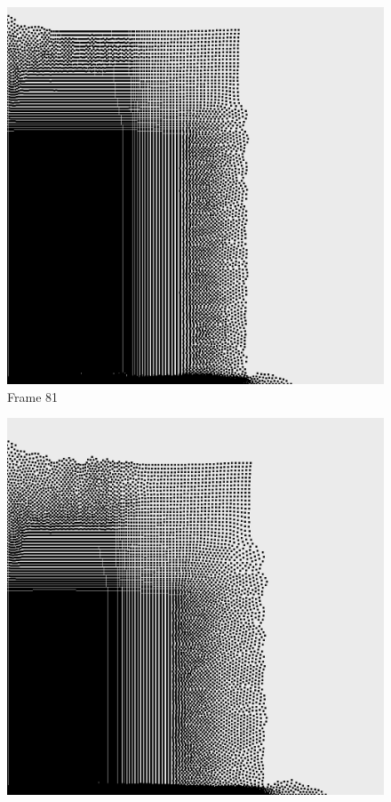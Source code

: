 \documentclass[a4paper, 12pt, oneside]{book}
\begin{document}
\begin{figure}[!ht]
    \addvspace{0.5ex}
        \begin{center}
            \includegraphics[width=\linewidth]{images/test_case_2/81.png}
            Frame 81
        \end{center}
    \endminipage
    \hfill
        \begin{center}
            \includegraphics[width=\linewidth]{images/test_case_2/101.png}

\end{center}
\end{figure}
\end{document}
